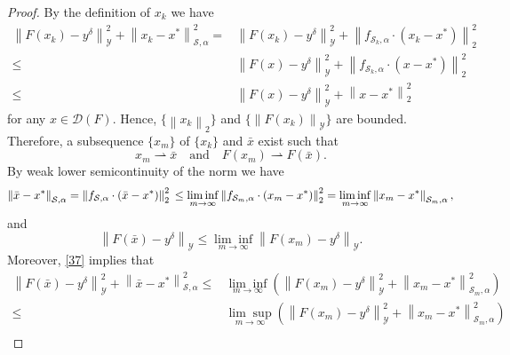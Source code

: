 \documentclass[11pt]{article}
\begin{document}
\begin{proof}
By the definition of $ x_k $ we have
\begin{equation}\label{37}
\begin{aligned}
\left\|F(x_k) - y^\delta\right\|^2_\mathcal{Y} + \left\|x_k - x^*\right\|_{\mathcal{S}, \alpha}^2
=
&\left\|F(x_k) - y^\delta\right\|^2_\mathcal{Y} + \left\|f_{\mathcal{S}_k,\alpha}\cdot (x_k-x^*)\right\|_2^2\\
\leq 
&\left\|F(x) - y^\delta\right\|^2_\mathcal{Y} + \left\|f_{\mathcal{S}_k,\alpha}\cdot (x-x^*)\right\|_2^2\\
\leq 
&\left\|F(x) - y^\delta\right\|^2_\mathcal{Y} + \left\|x-x^*\right\|_2^2
\end{aligned}
\end{equation}
for any $ x\in \mathcal{D}(F) $. Hence, $ \{\left\|x_k\right\|_2\} $ and $ \{\left\|F(x_k)\right\|_\mathcal{Y}\} $ are bounded. Therefore, a subsequence $ \{x_m\} $ of $ \{x_k\} $ and $\bar{x}$ exist such that
\begin{displaymath}
x_m\rightharpoonup\bar{x}\quad \mathrm{and}\quad F(x_m)\rightharpoonup F(\bar{x}).
\end{displaymath}
By weak lower semicontinuity of the norm we have
\begin{displaymath}
\left\|\bar{x} - x^*\right\|_{\mathcal{S}, \alpha} = \left\|f_{\mathcal{S},\alpha}\cdot (\bar{x}-x^*)\right\|_2^2\\
\leq
\underset{m\to \infty}{\lim\inf}\left\|f_{\mathcal{S}_m,\alpha}\cdot (x_m-x^*)\right\|_2^2 = \underset{m\to \infty}{\lim\inf}\left\|x_m - x^*\right\|_{\mathcal{S}_m, \alpha},
\end{displaymath}
and
\begin{equation}\label{38}
\left\|F(\bar{x}) - y^\delta\right\|_\mathcal{Y}\leq \underset{m\to \infty}{\lim\inf}\left\|F(x_m) - y^\delta\right\|_\mathcal{Y}.
\end{equation}
Moreover, \eqref{37} implies that
\begin{displaymath}
\begin{aligned}
\left\|F(\bar{x}) - y^\delta\right\|^2_\mathcal{Y} + \left\|\bar{x} - x^*\right\|_{\mathcal{S}, \alpha}^2
\leq 
&\underset{m\to \infty}{\lim\inf}\left(\left\|F(x_m) - y^\delta\right\|^2_\mathcal{Y} + \left\|x_m - x^*\right\|_{\mathcal{S}_m, \alpha}^2\right)\\
\leq 
&\underset{m\to \infty}{\lim\sup}\left(\left\|F(x_m) - y^\delta\right\|^2_\mathcal{Y} + \left\|x_m - x^*\right\|_{\mathcal{S}_m, \alpha}^2\right)\\

\end{aligned}
\end{displaymath}
\end{proof}
\end{document}
